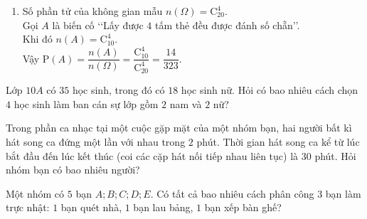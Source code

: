 \begin{bt}
{\begin{enumerate}
	{\bf TH3:} $1$ bi xanh, $1$ bi đỏ, $2$ bi vàng: $\mathrm{C}_5^1\mathrm{C}_4^1\mathrm{C}_6^2$ (cách).\\
	Vậy $n(A)=\mathrm{C}_5^2\mathrm{C}_4^1\mathrm{C}_6^1+\mathrm{C}_5^1\mathrm{C}_4^2\mathrm{C}_6^1+\mathrm{C}_5^1\mathrm{C}_4^1\mathrm{C}_6^2=720$.\\
	Vậy $\mathrm{P}(A)=\dfrac{n(A)}{n(\Omega)}=\dfrac{48}{91}$.
	\item Số phần tử của không gian mẫu $n(\Omega)=\mathrm{C}_{20}^4$.\\
	Gọi $A$ là biến cố \lq\lq Lấy được $4$ tấm thẻ đều được đánh số chẵn\rq\rq.\\
	Khi đó $n(A)=\mathrm{C}_{10}^4$.\\
	Vậy $\mathrm{P}(A)=\dfrac{n(A)}{n(\Omega)}=\dfrac{\mathrm{C}_{10}^4}{\mathrm{C}_{20}^4}=\dfrac{14}{323}$.
\end{enumerate}
}
\end{bt}

\begin{bt}%
	Lớp $10A$ có $35$ học sinh, trong đó có $18$ học sinh nữ. Hỏi có bao nhiêu cách chọn $4$ học sinh làm ban cán sự lớp gồm $ 2 $ nam và $ 2 $ nữ? 
\end{bt}

\begin{bt}%
	Trong phần ca nhạc tại một cuộc gặp mặt của một nhóm bạn, hai người bất kì hát song ca đứng một lần với nhau trong $2$ phút. Thời gian hát song ca kể từ lúc bắt đầu đến lúc kết thúc (coi các cặp hát nối tiếp nhau liên tục) là $30$ phút. Hỏi nhóm bạn có bao nhiêu người? 
\end{bt}

\begin{bt}%
	Một nhóm có $5$ bạn $A; B; C; D; E.$ Có tất cả bao nhiêu cách phân công $3$ bạn làm trực nhật: $1$ bạn quét nhà, $1$ bạn lau bảng, $1$ bạn xếp bàn ghế?
\end{bt}

